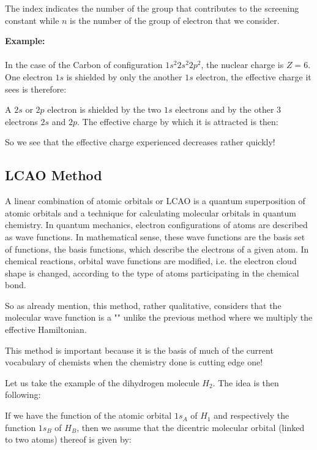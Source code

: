	The index indicates the number of the group that contributes to the screening constant while $n$ is the number of the group of electron that we consider.
	
	\pagebreak
	\begin{tcolorbox}[colframe=black,colback=white,sharp corners]
	\textbf{{\Large {}}Example:}\\\\
	In the case of the Carbon of configuration $1s^2 2s^2 2p^2$, the nuclear charge is $Z=6$. One electron $1s$ is shielded by only the another $1s$ electron, the effective charge it sees is therefore:
	
	A $2s$ or $2p$ electron is shielded by the two $1s$ electrons and by the other $3$ electrons $2s$ and $2p$. The effective charge by which it is attracted is then:
	
	So we see that the effective charge experienced decreases rather quickly!
	\end{tcolorbox}
	
	\subsection{LCAO Method}
	A linear combination of atomic orbitals or LCAO is a quantum superposition of atomic orbitals and a technique for calculating molecular orbitals in quantum chemistry. In quantum mechanics, electron configurations of atoms are described as wave functions. In mathematical sense, these wave functions are the basis set of functions, the basis functions, which describe the electrons of a given atom. In chemical reactions, orbital wave functions are modified, i.e. the electron cloud shape is changed, according to the type of atoms participating in the chemical bond.
	
	So as already mention, this method, rather qualitative, considers that the molecular wave function is a "" unlike the previous method where we multiply the effective Hamiltonian.
	
	This method is important because it is the basis of much of the current vocabulary of chemists when the chemistry done is cutting edge one!
	
	Let us take the example of the dihydrogen molecule $H_2$. The idea is then following:
	
	If we have the function of the atomic orbital $1s_A$ of $H_1$ and respectively the function $1s_B$ of $H_B$, then we assume that the dicentric molecular orbital (linked to two atoms) thereof is given by:
	
